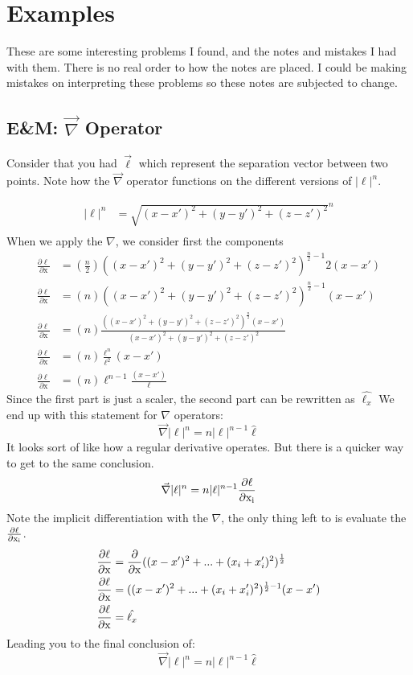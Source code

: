 \chapter{Examples}
These are some interesting problems I found, and the notes and mistakes I had with them. There is no
real order to how the notes are placed. I could be making mistakes on interpreting these problems so these notes are subjected to change.

\section{E\&M: $\vec{\nabla}$ Operator}

Consider that you had $\vec{\ell}$ which represent the separation vector between two points. Note how the $\vec{\nabla}$ operator functions on the different versions of $|\ell|^{n}$.

	{
		\begin{align*}
			|\ell|^{n} &= \sqrt{(x-x')^2+(y-y')^2+(z-z')^2}^n \\ 
		\end{align*}
		When we apply the $\nabla$, we consider first the components
		\begin{align*}
			\frac{\partial\ell}{\partial\mathrm{x}} &= (\frac{n}{2})({(x-x')^2+(y-y')^2+(z-z')^2})^{\frac{n}{2} - 1}2(x-x') \\
			\frac{\partial\ell}{\partial\mathrm{x}} &= (n)({(x-x')^2+(y-y')^2+(z-z')^2})^{\frac{n}{2} - 1}(x-x') \\
			\frac{\partial\ell}{\partial\mathrm{x}} &= (n)\frac{({(x-x')^2+(y-y')^2+(z-z')^2})^{\frac{n}{2}}(x-x')}{(x-x')^2+(y-y')^2+(z-z')^2} \\
			\frac{\partial\ell}{\partial\mathrm{x}} &= (n)\frac{\ell^{n}}{\ell^2}(x-x') \\
			\frac{\partial\ell}{\partial\mathrm{x}} &= (n)\ell^{n-1}\frac{(x-x')}{\ell}
		\end{align*}
		Since the first part is just a scaler, the second part can be rewritten as $\hat{\ell_x}$
		We end up with this statement for $\nabla$ operators:
		\begin{equation*}
			\vec\nabla{|\ell|^{n}} = n|\ell|^{n-1}\hat{\ell}
		\end{equation*}
		It looks sort of like how a regular derivative operates. But there is a quicker way to get to the same conclusion.
		\begin{align*}
			\vec\nabla{|\ell|^{n}} = n|\ell|^{n-1}\frac{\partial \ell}{\partial\mathrm{x_i}} 
		\end{align*}
		Note the implicit differentiation with the $\nabla$, the only thing left to is evaluate the 
		$\frac{\partial \ell}{\partial\mathrm{x_i}}$.
		\begin{align*}
			\pdi{{\ell}}{x} &= \pdi{\null}{x}((x-x')^2 + ... + (x_i + x'_i)^2)^{\frac{1}{2}} \\ 
			\pdi{{\ell}}{x} &= ((x-x')^2 + ... + (x_i + x'_i)^2)^{\frac{1}{2}-1}(x-x') \\ 
			\pdi{{\ell}}{x}	&= \hat{\ell_x}
		\end{align*}
		Leading you to the final conclusion of:
		\begin{equation*}
			\vec\nabla{|\ell|^{n}} = n|\ell|^{n-1}\hat{\ell}
		\end{equation*}
	}

